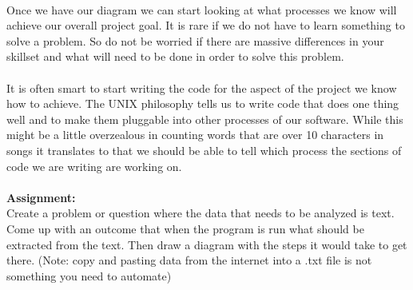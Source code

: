 \documentclass[..main.tex]{subfiles}
\begin{document}
\\
Once we have our diagram we can start looking at what processes we know will achieve our overall project goal. It is rare if we do not have to learn something to solve a problem. So do not be worried if there are massive differences in your skillset and what will need to be done in order to solve this problem. \\
\\
It is often smart to start writing the code for the aspect of the project we know how to achieve. The UNIX philosophy tells us to write code that does one thing well and to make them pluggable into other processes of our software. While this might be a little overzealous in counting words that are over 10 characters in songs it translates to that we should be able to tell which process the sections of code we are writing are working on.\\
\\
\textbf{Assignment:}
\\
Create a problem or question where the data that needs to be analyzed is text. Come up with an outcome that when the program is run what should be extracted from the text. Then draw a diagram with the steps it would take to get there. (Note: copy and pasting data from the internet into a .txt file is not something you need to automate)
\newpage
\end{document}
